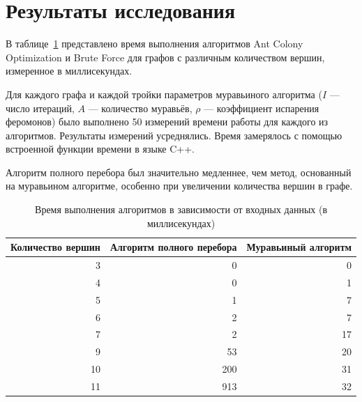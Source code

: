 \section{Результаты исследования}
В таблице~\ref{tbl:time_measurements} представлено время выполнения алгоритмов Ant Colony Optimization и Brute Force для графов с различным количеством вершин, измеренное в миллисекундах.

Для каждого графа и каждой тройки параметров муравьиного алгоритма (\(I\) --- число итераций, \(A\) --- количество муравьёв, \(\rho\) --- коэффициент испарения феромонов) было выполнено 50 измерений времени работы для каждого из алгоритмов. Результаты измерений усреднялись. Время замерялось с помощью встроенной функции времени в языке C++. 

Алгоритм полного перебора был значительно медленнее, чем метод, основанный на муравьином алгоритме, особенно при увеличении количества вершин в графе.

\begin{table}[h]
  \begin{center}
      \begin{threeparttable}
          \captionsetup{justification=raggedright,singlelinecheck=off}
          \caption{Время выполнения алгоритмов в зависимости от входных данных (в миллисекундах)}
          \label{tbl:time_measurements}
          \small
          \begin{tabular}{|r|r|r|}
              \hline
              Количество вершин & Алгоритм полного перебора & Муравьиный алгоритм \\
              \hline
              3 & 0 & 0 \\
              \hline
              4 & 0 & 1 \\
              \hline
              5 & 1 & 7 \\
              \hline
              6 & 2 & 7 \\
              \hline
              7 & 2 & 17 \\
              \hline
              9 & 53 & 20 \\
              \hline
              10 & 200 & 31 \\
              \hline
              11 & 913 & 32 \\
              \hline
          \end{tabular}
      \end{threeparttable}
  \end{center}
\end{table}

